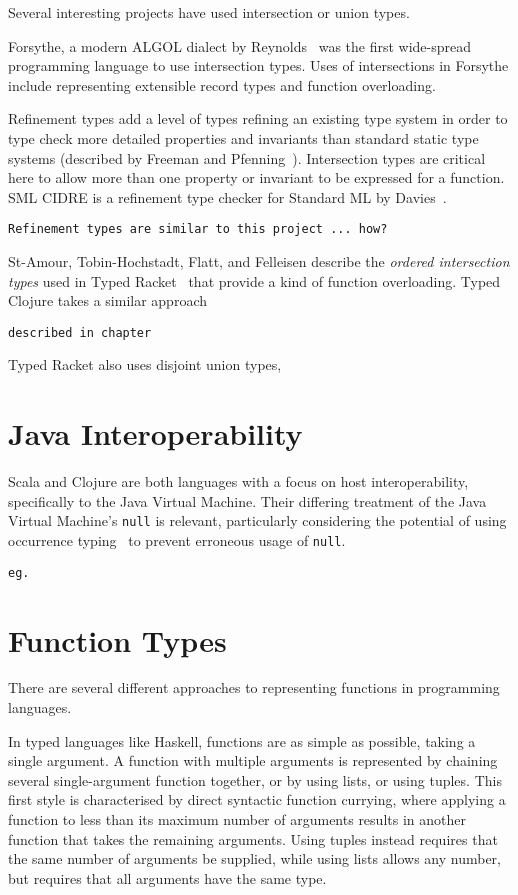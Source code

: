 Several interesting projects have used intersection or union types.

Forsythe, a modern ALGOL dialect by Reynolds~\cite{Rey96} was the first wide-spread 
programming language to use intersection types.
Uses of intersections in Forsythe include representing extensible record types
and function overloading.

Refinement types add a level of types refining an existing type system
in order to type check more detailed properties and invariants than standard static type systems
(described by Freeman and Pfenning~\cite{FP91}).
Intersection types are critical here to allow more than one property or invariant
to be expressed for a function.
SML CIDRE is a refinement type checker for Standard ML by Davies~\cite{Dav05}.
\begin{verbatim}
Refinement types are similar to this project ... how?
\end{verbatim}

St-Amour, Tobin-Hochstadt, Flatt, and Felleisen
describe the \emph{ordered intersection types} used in Typed Racket~\cite{St12}
that provide a kind of function overloading.
Typed Clojure takes a similar approach
\begin{verbatim}
described in chapter
\end{verbatim}
Typed Racket also uses disjoint union types, 

\section{Java Interoperability}

Scala and Clojure are both languages with a focus on host interoperability, specifically
to the Java Virtual Machine. Their differing treatment of the Java Virtual Machine's \lstinline|null| is
relevant, particularly considering the potential of using occurrence typing~\cite{TF10}
to prevent erroneous usage of \lstinline|null|.
\begin{verbatim}
eg.
\end{verbatim}

\section{Function Types}

There are several different approaches to representing functions in programming languages.

In typed languages like Haskell, functions are as simple as possible, taking a single argument.
A function with multiple arguments is represented by chaining several single-argument function
together, or by using lists, or using tuples. This first style is characterised by direct syntactic function currying, where applying
a function to less than its maximum number of arguments results in another function
that takes the remaining arguments.
Using tuples instead requires that the same number of arguments be supplied,
while using lists allows any number, but requires that all arguments have the same type.

